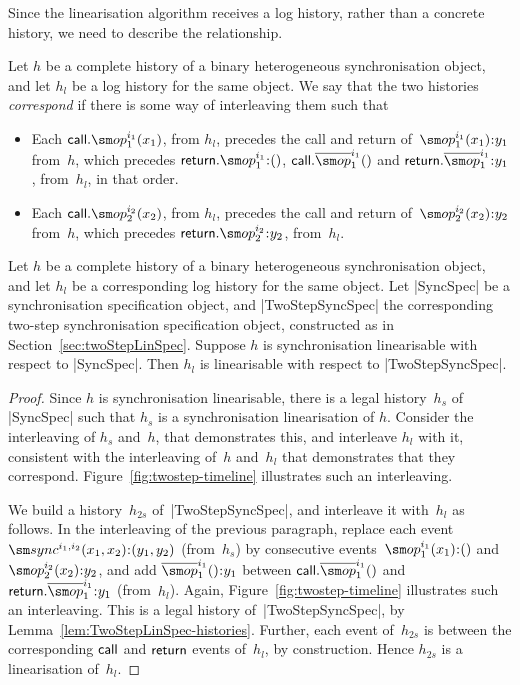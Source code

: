 Since the linearisation algorithm receives  a log history, rather
than a concrete history, we need to describe the relationship.  
%
\begin{definition}
Let $h$ be a complete history of a binary heterogeneous synchronisation
object, and let $h_l$ be a log history for the same object.  We say that the
two histories \emph{correspond} if there is some way of interleaving them such
that
%
\begin{itemize}
\item Each $\call.\op_1^{i_1}(x_1)$, from $h_l$, precedes the call and return
  of~$\op_1^{i_1}(x_1)\::y_1$ from~$h$, which precedes $\return.\op_1^{i_1} \::
  ()$, $\call.\overline{\op}_1^{i_1}()$ and $\return.\overline{\op}_1^{i_1}
  \:: y_1$, from~$h_l$, in that order.

\item Each $\call.\op_2^{i_2}(x_2)$, from $h_l$, precedes the call and return
  of~$\op_2^{i_2}(x_2)\::y_2$ from~$h$, which precedes $\return.\op_2^{i_2}
  \:: y_2$, from~$h_l$.
\end{itemize}
\end{definition}

\begin{prop}
\label{prop:twostep-testing}
Let $h$ be a complete history of a binary heterogeneous synchronisation
object, and let $h_l$ be a corresponding log history for the same object.  Let
|SyncSpec| be a synchronisation specification object, and |TwoStepSyncSpec|
the corresponding two-step synchronisation specification object, constructed
as in Section~\ref{sec:twoStepLinSpec}.  Suppose $h$ is synchronisation
linearisable with respect to |SyncSpec|.  Then $h_l$ is linearisable with
respect to |TwoStepSyncSpec|.
\end{prop}
%
\begin{proof}
Since $h$ is synchronisation linearisable, there is a legal history~$h_s$ of
|SyncSpec| such that $h_s$ is a synchronisation linearisation of $h$.
Consider the interleaving of $h_s$ and~$h$, that demonstrates this, and
interleave $h_l$ with it, consistent with the interleaving of~$h$ and~$h_l$
that demonstrates that they correspond.  Figure~\ref{fig:twostep-timeline}
illustrates such an interleaving.

We build a history~$h_{2s}$ of~|TwoStepSyncSpec|, and interleave it with~$h_l$
as follows.  In the interleaving of the previous paragraph, replace each event
$\sync^{i_1,i_2}(x_1,x_2)\::(y_1,y_2)$ (from~$h_s$) by consecutive
events~$\op_1^{i_1}(x_1)\::()$ and $\op_2^{i_2}(x_2)\::y_2$, and add
$\overline{\op}_1^{i_1}()\::y_1$ between $\call.\overline{\op}_1^{i_1}()$ and
$\return.\overline{\op}_1^{i_1} \:: y_1$ (from~$h_l$).  Again,
Figure~\ref{fig:twostep-timeline} illustrates such an interleaving.  This is a
legal history of~|TwoStepSyncSpec|, by
Lemma~\ref{lem:TwoStepLinSpec-histories}.  Further, each event of~$h_{2s}$ is
between the corresponding $\mathsf{call}$ and $\mathsf{return}$ events of~$h_l$, by
construction.  Hence $h_{2s}$ is a linearisation of~$h_l$.
\end{proof}


